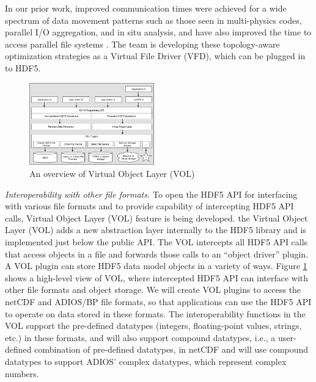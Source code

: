 In our prior work, improved communication times were achieved for a wide spectrum of data movement patterns such as those seen in multi-physics codes, parallel I/O aggregation, and in situ analysis, and have also improved the time to access parallel file systems \cite{}. The team is developing these topology-aware optimization strategies as a Virtual File Driver (VFD), which can be plugged in to HDF5. 

\begin{figure}
  \begin{center}
    \includegraphics[width=0.48\textwidth]{projects/2.3.4-DataViz/2.3.4.08-ExaHDF5/VOL-Overview.pdf}
  \end{center}
  \caption{An overview of Virtual Object Layer (VOL)}
  \label{fig:vol-overview}
\end{figure}

\textit{Interoperability with other file formats.} To open the HDF5 API for interfacing with various file formats and to provide capability of intercepting HDF5 API calls,  Virtual Object Layer (VOL) feature is being developed. the Virtual Object Layer (VOL) adds a new abstraction layer internally to the HDF5 library and is implemented just below the public API. The VOL intercepts all HDF5 API calls that access objects in a file and forwards those calls to an “object driver” plugin. A VOL plugin can store HDF5 data model objects in a variety of ways. Figure \ref{fig:vol-overview} shows a high-level view of VOL, where intercepted HDF5 API can interface with other file formats and object storage. We will create VOL plugins to access the netCDF and ADIOS/BP file formats, so that applications can use the HDF5 API to operate on data stored in these formats. The interoperability functions in the VOL support the pre-defined datatypes (integers, floating-point values, strings, etc.) in these formats, and will also support compound datatypes, i.e., a user-defined combination of pre-defined datatypes, in netCDF and will use compound datatypes to support ADIOS' complex datatypes, which represent complex numbers.



